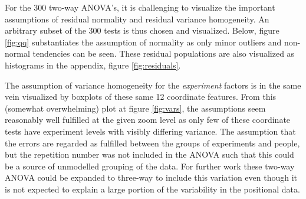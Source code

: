 \documentclass[11pt,fleqn]{article}
\begin{document}
For the 300 two-way ANOVA's, it is challenging to visualize the important assumptions of residual normality and residual variance homogeneity. An arbitrary subset of the 300 tests is thus chosen and visualized. Below, figure \ref{fig:qq} substantiates the assumption of normality as only minor outliers and non-normal tendencies can be seen. These residual populations are also visualized as histograms in the appendix, figure \ref{fig:residuals}.

The assumption of variance homogeneity for the \textit{experiment} factors is in the same vein visualized by boxplots of these same 12 coordinate features. 
From this (somewhat overwhelming) plot at figure \ref{fig:vars}, the assumptions seem reasonably well fulfilled at the given zoom level as only few of these coordinate tests have experiment levels with visibly differing variance.  
The assumption that the errors are regarded as fulfilled between the groups of experiments and people, but the repetition number was not included in the ANOVA such that this could be a source of unmodelled grouping of the data. 
For further work these two-way ANOVA could be expanded to three-way to include this variation even though it is not expected to explain a large portion of the variability in the positional data.
\end{document}
